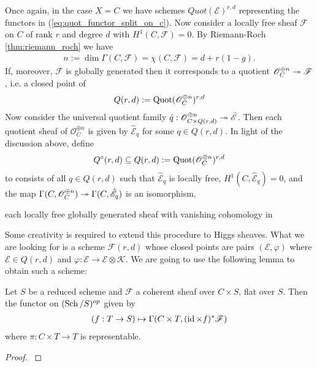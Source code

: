 \documentclass[12pt]{ociamthesis}  %
\begin{document}
\begin{example}\label{ex:quot_scheme_of_lf}
  Once again, in the case $X=C$ we have schemes
  $Quot(\mathscr E)^{r,d}$ representing the functors in
  (\ref{eq:quot_functor_split_on_c}). Now consider a locally free
  sheaf $\mathscr F$ on $C$ of rank
  $r$ and degree $d$ with $H^1(C,\mathscr F)=0$. By Riemann-Roch
  \ref{thm:riemann_roch} we have
  \begin{align*}
    n := \dim\Gamma(C,\mathscr F) = \chi(C,\mathscr F) = d + r(1-g).
  \end{align*}
  If, moreover, $\mathscr F$ is globally generated then it
  corresponds to a quotient $\mathscr O^{\oplus n}_C\twoheadrightarrow \mathscr F$,
  i.e. a closed point of
  \begin{align*}
   Q(r,d) := \operatorname{Quot}(\mathscr O^{\oplus n}_C)^{r,d}
  \end{align*}
  Now consider the universal quotient family
  $\hat q : \mathscr O^{\oplus n}_{C\times Q(r,d)} \twoheadrightarrow \hat{\mathscr E}$.
  Then each quotient sheaf of $\mathscr O_C^{\oplus n}$ is given by
  $\hat{\mathscr E}_q$ for some $q\in Q(r,d)$. In light of the discussion
  above, define
  \begin{align*}
    Q^\circ(r,d) \subseteq Q(r,d) := \operatorname{Quot}(\mathscr O^{\oplus n}_C)^{r,d}
  \end{align*}
  to consists of all $q\in Q(r,d)$ such that $\hat{\mathscr E}_q$ is locally
  free, $H^1(C,\hat{\mathscr E}_q)=0$, and the map
  $\Gamma(C,\mathscr O^{\oplus n}_C)\twoheadrightarrow\Gamma(C,\hat{\mathscr E}_q)$ is
  an isomorphism.

  each locally free globally generated sheaf with vanishing
  cohomology in
\end{example}

Some creativity is required to extend this procedure to Higgs
sheaves. What we are looking for is a scheme $\mathcal F(r,d)$ whose closed points
are pairs $(\mathscr E,\varphi)$ where $\mathscr E\in Q(r,d)$
and $\varphi : \mathscr E \to \mathscr E \otimes \mathscr K$.
We are going to use the following lemma to obtain such a scheme:

\begin{lemma}\label{lem:linear_scheme}
  Let $S$ be a reduced scheme and $\mathscr F$ a coherent sheaf over
  $C\times S$, flat over $S$. Then the functor on $(\operatorname{Sch}/S)^{op}$ given by
  \begin{align*}
    (f : T\to S) \mapsto \Gamma(C\times T,(\operatorname{id}\times f)^*\mathscr F)
  \end{align*}
  where $\pi : C\times T \to T$ is representable.
  \begin{proof}
    \cite[Lemma 3.5]{nitsure1991}
    \missingproof
  \end{proof}
\end{lemma}
\end{document}
